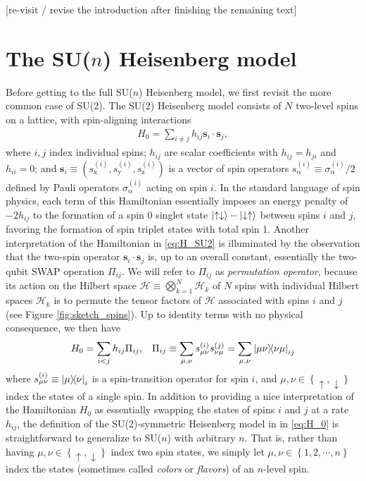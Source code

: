 \documentclass[nofootinbib,notitlepage,11pt]{revtex4-2}
\renewcommand{\set}[1]{\left\{#1\right\}} %
\renewcommand{\c}{\cdot} %
\newcommand{\m}{\bm} %
\newcommand{\1}{\mathds{1}}
\newcommand{\up}{\uparrow}
\newcommand{\dn}{\downarrow}
\newcommand{\x}{\text{x}}
\newcommand{\y}{\text{y}}
\newcommand{\z}{\text{z}}
\renewcommand{\H}{\mathcal{H}}
\newcommand{\red}[1]{{\color{red} #1}}
\begin{document}
\red{[re-visit / revise the introduction after finishing the remaining text]}

\section{The SU($n$) Heisenberg model}
\label{sec:bare_sun}

Before getting to the full SU($n$) Heisenberg model, we first revisit
the more common case of SU(2).
The SU(2) Heisenberg model consists of
$N$ two-level spins on a lattice, with spin-aligning interactions
\begin{align}
  H_0 = \sum_{i\ne j} h_{ij} \m s_i \c\m s_j,
  \label{eq:H_SU2}
\end{align}
where $i,j$ index individual spins; $h_{ij}$ are scalar coefficients with $h_{ij}=h_{ji}$ and $h_{ii}=0$; and $\m s_i\equiv(s_\x^{(i)},s_\y^{(i)},s_\z^{(i)})$ is a vector of spin operators $s_\alpha^{(i)}\equiv\sigma_\alpha^{(i)}/2$ defined by Pauli operators $\sigma_\alpha^{(i)}$ acting on spin $i$.
In the standard language of spin physics, each term of this Hamiltonian essentially imposes an energy penalty of $-2h_{ij}$ to the formation of a spin 0 singlet state $\ket{\up\dn}-\ket{\dn\up}$ between spins $i$ and $j$, favoring the formation of spin triplet states with total spin 1.
Another interpretation of the Hamiltonian in \eqref{eq:H_SU2} is illuminated by the observation that the two-spin operator $\m s_i\c\m s_j$ is, up to an overall constant, essentially the two-qubit SWAP operation $\Pi_{ij}$.
We will refer to $\Pi_{ij}$ as {\it permutation operator}, because its action on the Hilbert space $\H\equiv\bigotimes_{k=1}^N\H_k$ of $N$ spins with individual Hilbert spaces $\H_k$ is to permute the tensor factors of $\H$ associated with spins $i$ and $j$ (see Figure \ref{fig:sketch_spins}).
Up to identity terms with no physical consequence, we then have
\begin{align}
  H_0 = \sum_{i<j} h_{ij} \Pi_{ij},
  &&
  \Pi_{ij} \equiv \sum_{\mu,\nu} s_{\mu\nu}^{(i)} s_{\nu\mu}^{(j)}
  = \sum_{\mu,\nu} \op{\mu\nu}{\nu\mu}_{ij}
  \label{eq:H_0}
\end{align}
where $s_{\mu\nu}^{(i)}\equiv\op{\mu}{\nu}_i$ is a spin-transition operator for spin $i$, and $\mu,\nu\in\set{\up,\dn}$ index the states of a single spin.
In addition to providing a nice interpretation of the Hamiltonian $H_0$ as essentially swapping the states of spins $i$ and $j$ at a rate $h_{ij}$, the definition of the SU(2)-symmetric Heisenberg model in in \eqref{eq:H_0} is straightforward to generalize to SU($n$) with arbitrary $n$.
That is, rather than having $\mu,\nu\in\set{\up,\dn}$ index two spin states, we simply let $\mu,\nu\in\set{1,2,\cdots,n}$ index the states (sometimes called {\it colors} or {\it flavors}) of an $n$-level spin.
\end{document}
